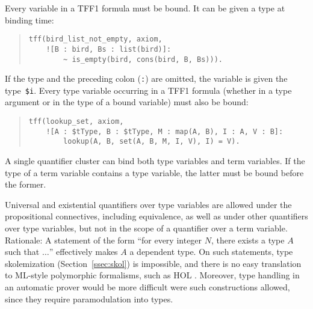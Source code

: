 Every variable in a TFF1 formula must be bound. It can be given a type at
binding time:
\begin{quote}
\begin{verbatim}
tff(bird_list_not_empty, axiom,
    ![B : bird, Bs : list(bird)]:
        ~ is_empty(bird, cons(bird, B, Bs))).
\end{verbatim}
\end{quote}
If the type and the preceding colon ({\tt :}) are omitted, the variable is given
the type~\verb+$i+. Every type variable occurring in a TFF1 formula
(whether in a type argument or in the type of a bound variable)
must also be bound:
\begin{quote}
\begin{verbatim}
tff(lookup_set, axiom,
    ![A : $tType, B : $tType, M : map(A, B), I : A, V : B]:
        lookup(A, B, set(A, B, M, I, V), I) = V).
\end{verbatim}
\end{quote}
A single quantifier cluster can bind both type variables and term variables. If
the type of a term variable contains a type variable, the latter must be bound
before the former.



Universal and existential quantifiers over type variables are allowed under the
propositional connectives, including equivalence, as well as under other
quantifiers over type variables, but not in the scope of a quantifier over a
term variable.
Rationale: A statement of the form ``for every integer $N$, there exists a type
$A$ such that $\ldots$'' effectively makes $A$ a dependent type.
On such statements, type skolemization (Section~\ref{ssec:skol}) is impossible,
and there is no easy translation to ML-style polymorphic formalisms,
such as HOL \cite{gordon-melham-1993}. Moreover, type handling in an automatic
prover would be more difficult were such constructions allowed, since they
require paramodulation into types.

